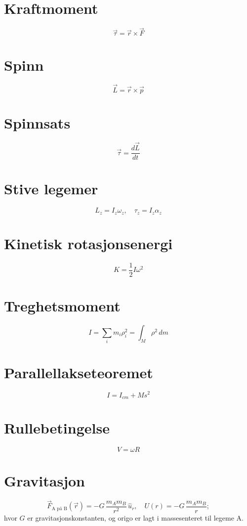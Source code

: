 \documentclass[a4paper,9pt]{extarticle}
\begin{document}
\begin{multicols}{2}
\section*{Kraftmoment}
\[ \vec{\tau} = \vec{r} \times \vec{F} \]


\section*{Spinn}
\[ \vec{L} = \vec{r} \times \vec{p} \]


\section*{Spinnsats}
\[ \vec{\tau} = \frac{d\vec{L}}{dt} \]


\section*{Stive legemer}
\[ L_z = I_z \omega_z, \quad \tau_z = I_z \alpha_z \]


\section*{Kinetisk rotasjonsenergi}
\[ K = \frac{1}{2} I \omega^2 \]


\section*{Treghetsmoment}
\[ I = \sum_i m_i \rho_i^2 = \int_M \rho^2 \, dm \]


\section*{Parallellakseteoremet}
\[ I = I_{cm} + M s^2 \]


\section*{Rullebetingelse}
\[ V = \omega R \]



\section*{{Gravitasjon}}

\[ \vec{F}_{\text{A på B}}(\vec{r}) = -G \, \frac{m_A m_B}{r^2} \, \hat{u}_r, \quad U(r) = -G \, \frac{m_A m_B}{r};   \]
hvor $G$ er gravitasjonskonstanten, og origo er lagt i massesenteret til legeme A.





\end{multicols}
\end{document}
